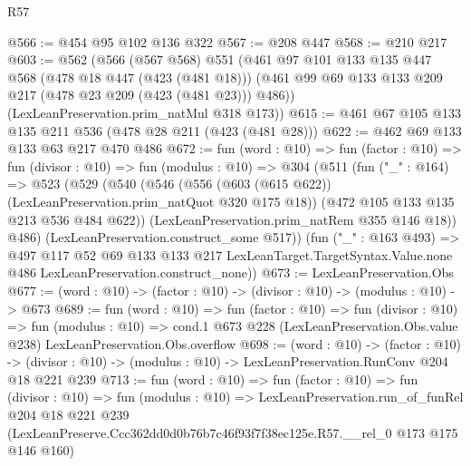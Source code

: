 \begin{lexlean}{R57}
\begin{coremodule}
@566 := @454 @95 @102 @136 @322
@567 := @208 @447
@568 := @210 @217
@603 := @562
    (@566
      (@567 @568)
      @551
      (@461
        @97
        @101
        @133
        @135
        @447
        @568
        (@478 @18 @447 (@423 (@481 @18)))
        (@461 @99 @69 @133 @133 @209 @217 (@478 @23 @209 (@423 (@481 @23))) @486))
      (LexLeanPreservation.prim_natMul @318 @173))
@615 := @461 @67 @105 @133 @135 @211 @536 (@478 @28 @211 (@423 (@481 @28)))
@622 := @462 @69 @133 @133 @63 @217 @470 @486
@672 := fun (word : @10) =>
  fun (factor : @10) =>
  fun (divisor : @10) =>
  fun (modulus : @10) =>
  @304
    (@511
      (fun ("_" : @164) =>
      @523
        (@529
          (@540
            (@546
              (@556 (@603 (@615 @622)) (LexLeanPreservation.prim_natQuot @320 @175 @18))
              (@472 @105 @133 @135 @213 @536 @484 @622))
            (LexLeanPreservation.prim_natRem @355 @146 @18))
          @486)
        (LexLeanPreservation.construct_some @517))
      (fun ("_" : @163 @493) =>
      @497
        @117
        @52
        @69
        @133
        @133
        @217
        LexLeanTarget.TargetSyntax.Value.none
        @486
        LexLeanPreservation.construct_none))
@673 := LexLeanPreservation.Obs
@677 := (word : @10) -> (factor : @10) -> (divisor : @10) -> (modulus : @10) -> @673
@689 := fun (word : @10) =>
  fun (factor : @10) =>
  fun (divisor : @10) =>
  fun (modulus : @10) =>
  cond.{1} @673 @228 (LexLeanPreservation.Obs.value @238) LexLeanPreservation.Obs.overflow
@698 := (word : @10) ->
  (factor : @10) ->
  (divisor : @10) -> (modulus : @10) -> LexLeanPreservation.RunConv @204 @18 @221 @239
@713 := fun (word : @10) =>
  fun (factor : @10) =>
  fun (divisor : @10) =>
  fun (modulus : @10) =>
  LexLeanPreservation.run_of_funRel
    @204
    @18
    @221
    @239
    (LexLeanPreserve.Ccc362dd0d0b76b7c46f93f7f38ec125e.R57.__rel_0 @173 @175 @146 @160)
\end{coremodule}
\end{lexlean}

